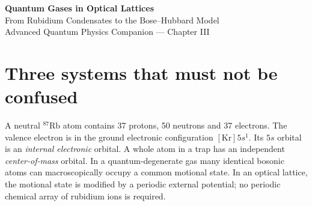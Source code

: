 \documentclass[11pt,a4paper]{article}
\begin{document}
\begin{center}
{\LARGE\bfseries\color{ink} Quantum Gases in Optical Lattices}\\[5pt]
{\Large From Rubidium Condensates to the Bose--Hubbard Model}\\[8pt]
{\small Advanced Quantum Physics Companion --- Chapter III}\end{center}
\begin{abstract}
This chapter continues the distinction between bound electronic orbitals of neutral rubidium and external motional orbitals of whole atoms. We derive optical-lattice potentials, recoil scales, Bloch and Wannier states, and the Bose--Hubbard Hamiltonian. Ten detailed worked examples connect tunneling, interactions, coherent and Mott states, number fluctuations and time-of-flight interference. Throughout, a lattice of trapped atoms is distinguished from an electronic crystal and the picokelvin Tiangong free-expansion experiment.
\end{abstract}
\tableofcontents\newpage
\section{Three systems that must not be confused}
A neutral $^{87}\mathrm{Rb}$ atom contains 37 protons, 50 neutrons and 37 electrons. The valence electron is in the ground electronic configuration $[\mathrm{Kr}]5s^1$. Its $5s$ orbital is an \emph{internal electronic} orbital. A whole atom in a trap has an independent \emph{center-of-mass} orbital. In a quantum-degenerate gas many identical bosonic atoms can macroscopically occupy a common motional state. In an optical lattice, the motional state is modified by a periodic external potential; no periodic chemical array of rubidium ions is required.
\begin{center}\end{center}
\end{document}
